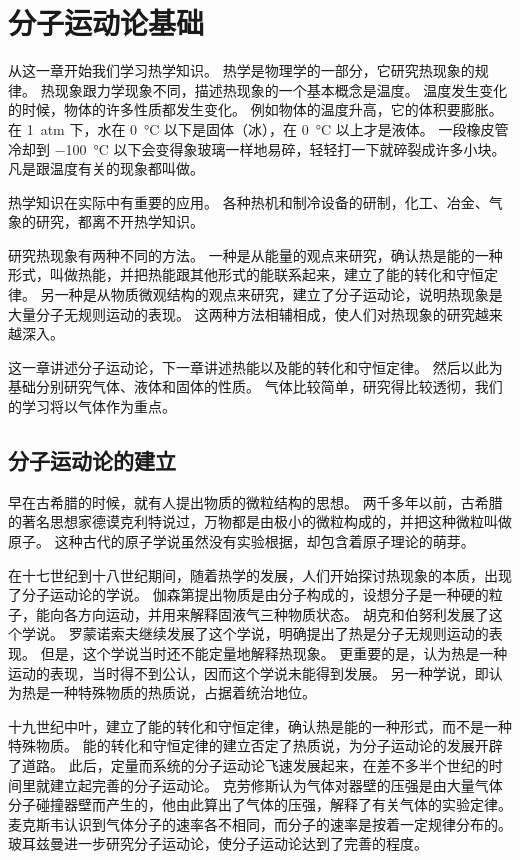 \chapter{分子运动论基础}
从这一章开始我们学习热学知识。
热学是物理学的一部分，它研究热现象的规律。
热现象跟力学现象不同，描述热现象的一个基本概念是温度。
温度发生变化的时候，物体的许多性质都发生变化。
例如物体的温度升高，它的体积要膨胀。在 \qty{1}{atm} 下，水在 \qty{0}{\celsius} 以下是固体（冰），在 \qty{0}{\celsius} 以上才是液体。
一段橡皮管冷却到 \qty{-100}{\celsius} 以下会变得象玻璃一样地易碎，轻轻打一下就碎裂成许多小块。
凡是跟温度有关的现象都叫做。

热学知识在实际中有重要的应用。
各种热机和制冷设备的研制，化工、冶金、气象的研究，都离不开热学知识。

研究热现象有两种不同的方法。
一种是从能量的观点来研究，确认热是能的一种形式，叫做热能，并把热能跟其他形式的能联系起来，建立了能的转化和守恒定律。
另一种是从物质微观结构的观点来研究，建立了分子运动论，说明热现象是大量分子无规则运动的表现。
这两种方法相辅相成，使人们对热现象的研究越来越深入。

这一章讲述分子运动论，下一章讲述热能以及能的转化和守恒定律。
然后以此为基础分别研究气体、液体和固体的性质。
气体比较简单，研究得比较透彻，我们的学习将以气体作为重点。

\section{分子运动论的建立}
早在古希腊的时候，就有人提出物质的微粒结构的思想。
两千多年以前，古希腊的著名思想家德谟克利特说过，万物都是由极小的微粒构成的，并把这种微粒叫做原子。
这种古代的原子学说虽然没有实验根据，却包含着原子理论的萌芽。

在十七世纪到十八世纪期间，随着热学的发展，人们开始探讨热现象的本质，出现了分子运动论的学说。
伽森第提出物质是由分子构成的，设想分子是一种硬的粒子，能向各方向运动，并用来解释固液气三种物质状态。
胡克和伯努利发展了这个学说。
罗蒙诺索夫继续发展了这个学说，明确提出了热是分子无规则运动的表现。
但是，这个学说当时还不能定量地解释热现象。
更重要的是，认为热是一种运动的表现，当时得不到公认，因而这个学说未能得到发展。
另一种学说，即认为热是一种特殊物质的热质说，占据着统治地位。

十九世纪中叶，建立了能的转化和守恒定律，确认热是能的一种形式，而不是一种特殊物质。
能的转化和守恒定律的建立否定了热质说，为分子运动论的发展开辟了道路。
此后，定量而系统的分子运动论飞速发展起来，在差不多半个世纪的时间里就建立起完善的分子运动论。
克劳修斯认为气体对器壁的压强是由大量气体分子碰撞器壁而产生的，他由此算出了气体的压强，解释了有关气体的实验定律。
麦克斯韦认识到气体分子的速率各不相同，而分子的速率是按着一定规律分布的。
玻耳兹曼进一步研究分子运动论，使分子运动论达到了完善的程度。

